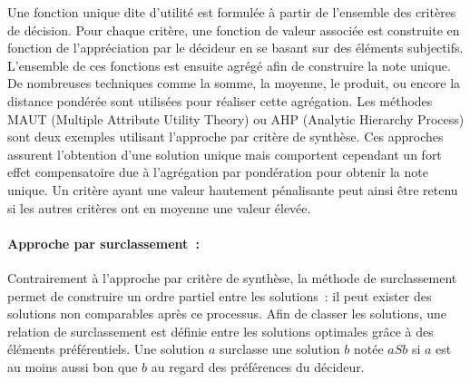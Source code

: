Une fonction unique dite d’utilité est formulée à partir de l’ensemble des critères
de décision. Pour chaque critère, une fonction de valeur associée est construite en
fonction de l’appréciation par le décideur en se basant sur des éléments subjectifs.
L’ensemble de ces fonctions est ensuite agrégé afin de construire la note unique.
De nombreuses techniques comme la somme, la moyenne, le produit, ou encore la distance
pondérée sont utilisées pour réaliser cette agrégation.
Les méthodes MAUT (Multiple Attribute Utility Theory) \parencite{Fishburn1970}
ou AHP (Analytic Hierarchy Process) \parencite{Saaty1987161} sont deux exemples utilisant
l’approche par critère de synthèse.
Ces approches assurent l’obtention d’une solution unique mais comportent
cependant un fort effet compensatoire due à l’agrégation par pondération pour
obtenir la note unique. Un critère ayant une valeur hautement pénalisante peut
ainsi être retenu si les autres critères ont en moyenne une valeur élevée.

\paragraph{Approche par surclassement~:} %
\label{par:approche_par_surclassement}
Contrairement à l’approche par critère de synthèse, la méthode de surclassement
permet de construire un ordre partiel entre les solutions~: il peut exister
des solutions non comparables après ce processus.
Afin de classer les solutions, une relation de surclassement est définie entre les
solutions optimales grâce à des éléments préférentiels.
Une solution $a$ surclasse une solution $b$ notée $aSb$ si $a$ est au moins aussi
bon que $b$ au regard des préférences du décideur.

